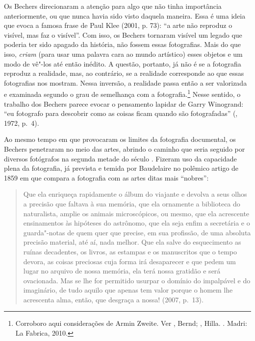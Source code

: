 Os Bechers direcionaram a atenção para algo que não tinha importância
anteriormente, ou que nunca havia sido visto daquela maneira. Essa é uma
ideia que evoca a famosa frase de Paul Klee (2001, p. 73): ``a arte não
reproduz o visível, mas faz o visível''. Com isso, os Bechers tornaram
visível um legado que poderia ter sido apagado da história, não fossem
essas fotografias. Mais do que isso, \emph{criam} (para usar uma palavra
cara ao mundo artístico) esses objetos e um modo de vê"-los até então
inédito. A questão, portanto, já não é se a fotografia reproduz a
realidade, mas, ao contrário, se a realidade corresponde ao que essas
fotografias nos mostram. Nessa inversão, a realidade passa então a ser
valorizada e examinada segundo o grau de semelhança com a
fotografia.\footnote{Corroboro aqui considerações de Armin Zweite. Ver
  , Bernd; , Hilla. {}. Madri: La Fabrica, 2010.}
Nesse sentido, o trabalho dos Bechers parece evocar o pensamento lapidar
de Garry Winogrand: ``eu fotografo para descobrir como as coisas ficam
quando são fotografadas'' (, 1972, p.~4).

Ao mesmo tempo em que provocaram os limites da fotografia documental, os
Bechers penetraram no meio das artes, abrindo o caminho que seria
seguido por diversos fotógrafos na segunda metade do século . Fizeram
uso da capacidade plena da fotografia, já prevista e temida por
Baudelaire no polêmico artigo de 1859 em que compara a
fotografia com as artes ditas mais ``nobres'':

\begin{quote}
Que ela enriqueça rapidamente o álbum do viajante e devolva a seus olhos
a precisão que faltava à sua memória, que ela ornamente a biblioteca do
naturalista, amplie os animais microscópicos, ou mesmo, que ela
acrescente ensinamentos às hipóteses do astrônomo, que ela seja enfim a
secretária e o guarda"-notas de quem quer que precise, em sua profissão,
de uma absoluta precisão material, até aí, nada melhor. Que ela salve do
esquecimento as ruínas decadentes, os livros, as estampas e os
manuscritos que o tempo devora, as coisas preciosas cuja forma irá
desaparecer e que pedem um lugar no arquivo de nossa memória, ela terá
nossa gratidão e será ovacionada. Mas se lhe for permitido usurpar o
domínio do impalpável e do imaginário, de tudo aquilo que apenas tem
valor porque o homem lhe acrescenta alma, então, que desgraça a nossa!
(2007, p.~13).
\end{quote}

